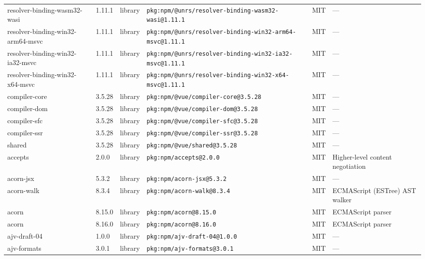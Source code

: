 \documentclass[11pt,a4paper]{article}
\begin{document}
\begin{longtable}{|p{4cm}|p{2cm}|p{1.6cm}|p{5cm}|p{1.5cm}|p{3.5cm}|}
\raggedright resolver-binding-wasm32-wasi & 1.11.1 & library & \small\texttt{pkg:npm/@unrs/resolver-binding-wasm32-wasi@1.11.1} & MIT & \small — \\
\raggedright resolver-binding-win32-arm64-msvc & 1.11.1 & library & \small\texttt{pkg:npm/@unrs/resolver-binding-win32-arm64-msvc@1.11.1} & MIT & \small — \\
\raggedright resolver-binding-win32-ia32-msvc & 1.11.1 & library & \small\texttt{pkg:npm/@unrs/resolver-binding-win32-ia32-msvc@1.11.1} & MIT & \small — \\
\raggedright resolver-binding-win32-x64-msvc & 1.11.1 & library & \small\texttt{pkg:npm/@unrs/resolver-binding-win32-x64-msvc@1.11.1} & MIT & \small — \\
\raggedright compiler-core & 3.5.28 & library & \small\texttt{pkg:npm/@vue/compiler-core@3.5.28} & MIT & \small — \\
\raggedright compiler-dom & 3.5.28 & library & \small\texttt{pkg:npm/@vue/compiler-dom@3.5.28} & MIT & \small — \\
\raggedright compiler-sfc & 3.5.28 & library & \small\texttt{pkg:npm/@vue/compiler-sfc@3.5.28} & MIT & \small — \\
\raggedright compiler-ssr & 3.5.28 & library & \small\texttt{pkg:npm/@vue/compiler-ssr@3.5.28} & MIT & \small — \\
\raggedright shared & 3.5.28 & library & \small\texttt{pkg:npm/@vue/shared@3.5.28} & MIT & \small — \\
\raggedright accepts & 2.0.0 & library & \small\texttt{pkg:npm/accepts@2.0.0} & MIT & \small Higher-level content negotiation \\
\raggedright acorn-jsx & 5.3.2 & library & \small\texttt{pkg:npm/acorn-jsx@5.3.2} & MIT & \small — \\
\raggedright acorn-walk & 8.3.4 & library & \small\texttt{pkg:npm/acorn-walk@8.3.4} & MIT & \small ECMAScript (ESTree) AST walker \\
\raggedright acorn & 8.15.0 & library & \small\texttt{pkg:npm/acorn@8.15.0} & MIT & \small ECMAScript parser \\
\raggedright acorn & 8.16.0 & library & \small\texttt{pkg:npm/acorn@8.16.0} & MIT & \small ECMAScript parser \\
\raggedright ajv-draft-04 & 1.0.0 & library & \small\texttt{pkg:npm/ajv-draft-04@1.0.0} & MIT & \small — \\
\raggedright ajv-formats & 3.0.1 & library & \small\texttt{pkg:npm/ajv-formats@3.0.1} & MIT & \small — \\

\end{longtable}
\end{document}
